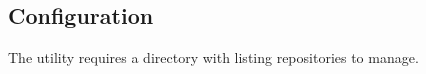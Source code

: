
\subsection{Configuration}
The  utility requires a  directory with
 listing repositories to manage.

